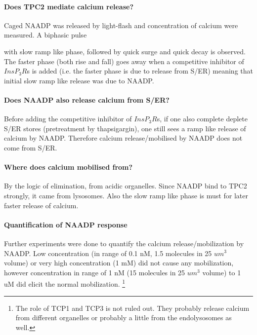 \documentclass[twocolumn]{article}
\begin{document}
\paragraph{Does TPC2 mediate calcium release?} Caged NAADP was released by
light-flash and concentration of calcium were measured. A biphasic pulse
 with slow ramp like phase, followed by quick surge and quick
decay is observed. The faster phase (both rise and fall) goes away when a
competitive inhibitor of $InsP_3R$s is added (i.e. the faster phase is due to
release from S/ER) meaning that initial slow ramp like release was due to NAADP.

\paragraph{Does NAADP also release calcium from S/ER?} Before adding the
competitive inhibitor of $InsP_3R$s, if one also complete deplete S/ER stores
(pretreatment by thapsigargin), one still sees a ramp like release of calcium by
NAADP. Therefore calcium release/mobilised by NAADP does not come from S/ER.

\paragraph{Where does calcium mobilised from?} By the logic of elimination, from
acidic organelles. Since NAADP bind to TPC2 strongly, it came from lysosomes.
Also the slow ramp like phase is must for later faster release of calcium.

\paragraph{Quantification of NAADP response} Further experiments were done to
quantify the calcium release/mobilization by NAADP. Low concentration (in range
of 0.1 nM, 1.5 molecules in 25 $um^3$ volume) or very high concentration  (1 mM)
did not cause any mobilization, however concentration in range of 1 nM (15
molecules in 25 $um^3$ volume) to 1 uM did  elicit the normal mobilization.
\footnote{The role of TCP1 and TCP3 is not ruled out. They probably release
    calcium from different organelles or probably a little from the
    endolysosomes as well.}
\end{document}
